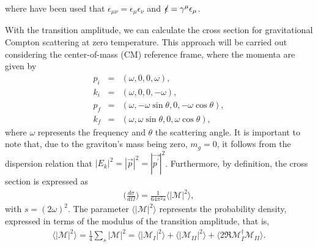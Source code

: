 \documentclass[11pt,showpacs,preprintnumbers,amsmath,amssymb,prd,nofootinbib,superscriptaddress]{revtex4-2}
\begin{document}
where have been used that $\epsilon_{\mu\nu}=\epsilon_\mu \epsilon_\nu$ and $\slashed{\epsilon}=\gamma^\mu \epsilon_\mu$. 

With the transition amplitude, we can calculate the cross section for gravitational Compton scattering at zero temperature. This approach will be carried out considering the center-of-mass (CM) reference frame, where the momenta are given by
\begin{eqnarray}
    p_i&=&(\omega,0,0,\omega),\nonumber\\
    k_i&=&(\omega,0,0,-\omega),\nonumber\\
    p_f&=&(\omega,-\omega\sin{\theta},0,-\omega\cos{\theta}),\nonumber\\
    k_f&=&(\omega,\omega\sin{\theta,0,\omega\cos{\theta}}),
\end{eqnarray}
where $\omega$ represents the frequency and $\theta$ the scattering angle. It is important to note that, due to the graviton's mass being zero, $m_g=0$, it follows from the dispersion relation that $|E_k|^2=|\vec{p}|^2=|\vec{p^\prime}|^2$. Furthermore, by definition, the cross section is expressed as
\begin{eqnarray}
    \Big(\frac{d\sigma}{d\Omega}\Big)=\frac{1}{64\pi^2 s}\langle|\mathcal{M}|^2\rangle,\label{3.2}
\end{eqnarray}
with $s=(2\omega)^2$. The parameter $\langle|\mathcal{M}|^2\rangle$  represents the probability density, expressed in terms of the modulus of the transition amplitude, that is,
\begin{eqnarray}
    \langle|\mathcal{M}|^2\rangle=\frac{1}{4}\sum_s|\mathcal{M}|^2=\langle|\mathcal{M}_I|^2\rangle+\langle|\mathcal{M}_{II}|^2\rangle+\langle2\Re\mathcal{M}_I^\dagger\mathcal{M}_{II}\rangle.\label{3.3}
\end{eqnarray}
\end{document}
